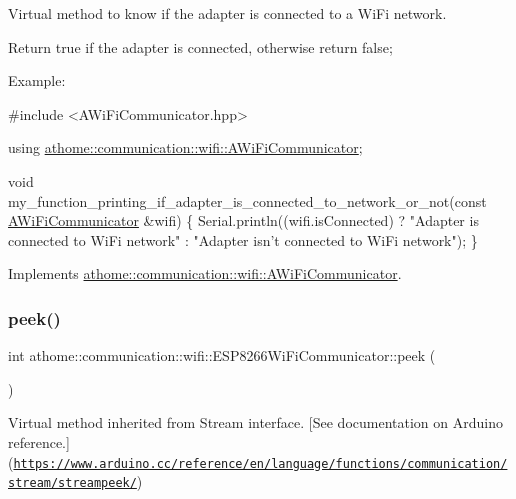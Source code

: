 Virtual method to know if the adapter is connected to a Wi\+Fi network.

Return true if the adapter is connected, otherwise return false;

Example\+:


\begin{DoxyCode}
\textcolor{preprocessor}{#include <AWiFiCommunicator.hpp>}

\textcolor{keyword}{using} \mbox{\hyperlink{classathome_1_1communication_1_1wifi_1_1_a_wi_fi_communicator}{athome::communication::wifi::AWiFiCommunicator}};

\textcolor{keywordtype}{void} my\_function\_printing\_if\_adapter\_is\_connected\_to\_network\_or\_not(\textcolor{keyword}{const}
\mbox{\hyperlink{classathome_1_1communication_1_1wifi_1_1_a_wi_fi_communicator_a0098148fe8d0eeee99b7f8f72a72a900}{AWiFiCommunicator}} &wifi) \{ Serial.println((wifi.isConnected) ? \textcolor{stringliteral}{"Adapter is}
\textcolor{stringliteral}{connected to WiFi network"} : \textcolor{stringliteral}{"Adapter isn't connected to WiFi network"});
\}
\end{DoxyCode}
 

Implements \mbox{\hyperlink{classathome_1_1communication_1_1wifi_1_1_a_wi_fi_communicator_a578087d01c814481d89ea702a6d7ed01}{athome\+::communication\+::wifi\+::\+A\+Wi\+Fi\+Communicator}}.

\mbox{\label{classathome_1_1communication_1_1wifi_1_1_e_s_p8266_wi_fi_communicator_affeb5491ad5c97fa53a683926f8184d2}} 
\subsubsection{\texorpdfstring{peek()}{peek()}}
{\footnotesize\ttfamily int athome\+::communication\+::wifi\+::\+E\+S\+P8266\+Wi\+Fi\+Communicator\+::peek (\begin{DoxyParamCaption}{ }\end{DoxyParamCaption})\hspace{0.3cm}{\ttfamily [virtual]}}

Virtual method inherited from Stream interface. \mbox{[}See documentation on Arduino reference.\mbox{]}(\href{https://www.arduino.cc/reference/en/language/functions/communication/stream/streampeek/}{\tt https\+://www.\+arduino.\+cc/reference/en/language/functions/communication/stream/streampeek/}) 

